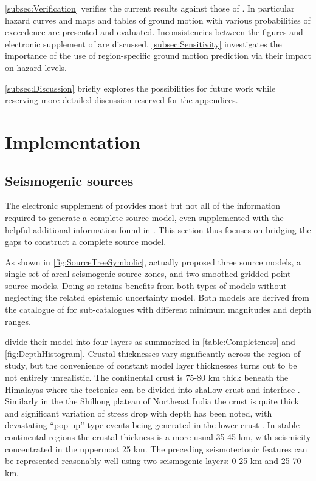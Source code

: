 \documentclass{article}
\begin{document}
\autoref{subsec:Verification} verifies the current results against those of  \cite{nath2012probabilistic}. In particular hazard curves and maps and tables of ground motion with various probabilities of exceedence are presented and evaluated. Inconsistencies between the figures and electronic supplement of \cite{nath2012probabilistic} are discussed. \autoref{subsec:Sensitivity} investigates the importance of the use of region-specific ground motion prediction via their impact on hazard levels.

\autoref{subsec:Discussion} briefly explores the possibilities for future work while reserving more detailed discussion reserved for the appendices.

\section{Implementation}
\label{sec:Implementation}

\subsection{Seismogenic sources}
\label{subsec:Sources}

The electronic supplement of \cite{nath2012probabilistic} provides most but not all of the information required to generate a complete source model, even supplemented with the helpful additional information found in \cite{thingbaijam2011seismogenic}. This section thus focuses on bridging the gaps to construct a complete source model.

As shown in \autoref{fig:SourceTreeSymbolic}, \cite{nath2012probabilistic} actually proposed three source models, a single set of areal seismogenic source zones, and two smoothed-gridded point source models. Doing so retains benefits from both types of models without neglecting the related epistemic uncertainty model. Both models are derived from the catalogue of \cite{nath2010earthquake} for sub-catalogues with different minimum magnitudes and depth ranges.

\cite{thingbaijam2011seismogenic} divide their model into four layers as summarized in \autoref{table:Completeness} and \autoref{fig:DepthHistogram}. Crustal thicknesses vary significantly across the region of study, but the convenience of constant model layer thicknesses turns out to be not entirely unrealistic. The continental crust is 75-80 km thick beneath the Himalayas where the tectonics can be divided into shallow crust and interface \citep{thingbaijam2011seismogenic}. Similarly in the the Shillong plateau of Northeast India the crust is quite thick and significant variation of stress drop with depth has been noted, with devastating ``pop-up'' type events \cite{bilham2001plateau} being generated in the lower crust \citep{nath2012ground}. In stable continental regions the crustal thickness is a more usual 35-45 km, with seismicity concentrated in the uppermost 25 km. The preceding seismotectonic features can be represented reasonably well using two seismogenic layers: 0-25 km and 25-70 km. 
\end{document}
